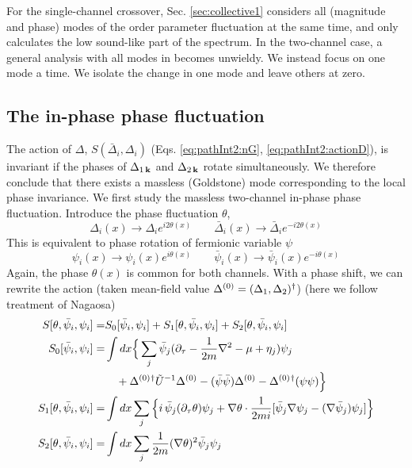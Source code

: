   For the single-channel crossover, Sec. \ref{sec:collective1} considers all (magnitude and phase) modes of the order parameter fluctuation at the same time, and only calculates  the low sound-like part of the spectrum. In the two-channel case, a general analysis with all modes in becomes unwieldy.  
We instead focus on one mode a time. We isolate the change in one mode and leave others at zero.  


\subsection{The in-phase phase fluctuation }
The action of $\Delta$, $S(\bar{\Delta}_i,\Delta_i)$ (Eqs. \ref{eq:pathInt2:nG}, \ref{eq:pathInt2:actionD}), is invariant if the phases of $\Delta_{1\,\mathbf{k}}$ and $\Delta_{2\,\mathbf{k}}$ rotate simultaneously. We therefore conclude that there exists a massless (Goldstone) mode corresponding to the local phase invariance. We first study the massless two-channel in-phase phase fluctuation.   Introduce the phase fluctuation $\theta$, 
\begin{equation*}
\Delta_{i}(x)\rightarrow{}\Delta_{i}e^{i2\theta(x)}\qquad{}
\bar{\Delta}_{i}(x)\rightarrow{}\bar{\Delta}_{i}e^{-i2\theta(x)}
\end{equation*}
This is equivalent to  phase  rotation of fermionic variable $\psi$
\begin{equation*}
\psi_{i}(x)\rightarrow{}\psi_{i}(x)e^{i\theta(x)}\qquad{}
\bar{\psi}_{i}(x)\rightarrow{}\bar{\psi}_{i}(x)e^{-i\theta(x)}
\end{equation*}
Again, the phase $\theta(x)$ is common for  both channels.   With a phase shift, we can rewrite the action (taken mean-field value $\Delta^{(0)}=(\Delta_1,\Delta_2)^{\dagger}$) (here we  follow treatment of Nagaosa\cite{Nagaosa})
\begin{subequations}\label{eq:pathInt2:actionPhase}
\begin{align}
S[\theta,\bar\psi_{i},\psi_{i}]=&S_0[\bar\psi_{i},\psi_{i}]+S_1[\theta,\bar\psi_{i},\psi_{i}]+S_2[\theta,\bar\psi_{i},\psi_{i}]\\
S_0[\bar\psi_{i},\psi_{i}]=&\int{dx}
\Big\{\sum_{j}\bar\psi_{j}(\partial_\tau-\frac{1}{2m}\nabla^{2}-\mu+\eta_{j})\psi_{j}\nonumber\\
&\quad+\Delta^{(0)}{}^{\dagger}\tilde{U}^{-1}\Delta^{(0)}-(\bar\psi\bar\psi)\Delta^{(0)}-{\Delta^{(0)}}{}^{\dagger}(\psi\psi)\Big\}\\
S_1[\theta,\bar\psi_{i},\psi_{i}]=&\int{dx}\sum_{j}\Big\{
   i\,\bar\psi_{j}(\partial_{\tau}\theta)\psi_{j}+\nabla\theta\cdot\frac{1}{2mi}[\bar\psi_{j}\nabla\psi_{j}-(\nabla\bar{\psi}_{j})\psi_{j}]\Big\}\\
S_2[\theta,\bar\psi_{i},\psi_{i}]=&\int{dx}\sum_{j}\frac{1}{2m}(\nabla\theta)^{2}\bar\psi_{j}\psi_{j}
\end{align}
\end{subequations}
